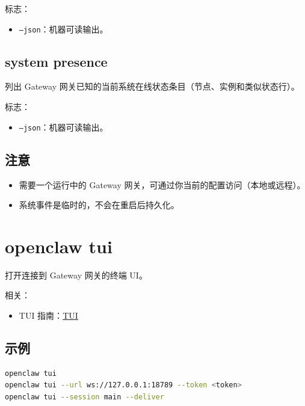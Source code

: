标志：

\begin{itemize}
  \item \texttt{--json}：机器可读输出。
\end{itemize}


\subsection{system presence}


列出 Gateway 网关已知的当前系统在线状态条目（节点、实例和类似状态行）。

标志：

\begin{itemize}
  \item \texttt{--json}：机器可读输出。
\end{itemize}


\subsection{注意}


\begin{itemize}
  \item 需要一个运行中的 Gateway 网关，可通过你当前的配置访问（本地或远程）。
  \item 系统事件是临时的，不会在重启后持久化。
\end{itemize}



\clearpage

\section{openclaw tui}


打开连接到 Gateway 网关的终端 UI。

相关：

\begin{itemize}
  \item TUI 指南：\href{/web/tui}{TUI}
\end{itemize}


\subsection{示例}


\begin{lstlisting}[language=bash]
openclaw tui
openclaw tui --url ws://127.0.0.1:18789 --token <token>
openclaw tui --session main --deliver
\end{lstlisting}



